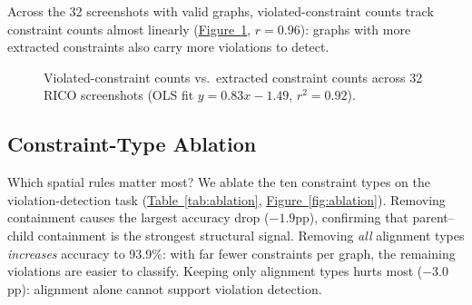 \documentclass[11pt, letterpaper]{article}
\begin{document}
Across the 32 screenshots with valid graphs, violated-constraint counts
track constraint counts almost linearly (\hyperref[fig:vcount]{Figure~\ref{fig:vcount}}, $r = 0.96$):
graphs with more extracted constraints also carry more violations to detect.

\begin{figure}[htbp]
\centering
{}
\caption{Violated-constraint counts vs.\ extracted constraint counts across
32 RICO screenshots (OLS fit $y = 0.83x - 1.49$, $r^2 = 0.92$).}
\label{fig:vcount}
\end{figure}

\subsection{Constraint-Type Ablation}
Which spatial rules matter most? We ablate the ten constraint types on the
violation-detection task (\hyperref[tab:ablation]{Table~\ref{tab:ablation}}, \hyperref[fig:ablation]{Figure~\ref{fig:ablation}}).
Removing containment causes the largest accuracy drop ($-1.9$pp), confirming
that parent--child containment is the strongest structural signal. Removing
\emph{all} alignment types \emph{increases} accuracy to 93.9\%: with far
fewer constraints per graph, the remaining violations are easier to
classify. Keeping only alignment types hurts most ($-3.0$pp): alignment alone
cannot support violation detection.
\end{document}
